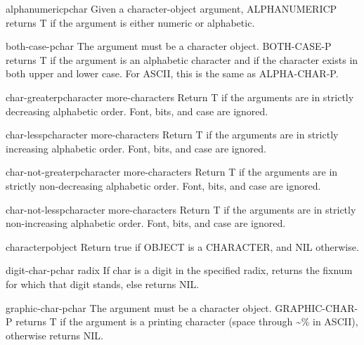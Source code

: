 \documentclass[10pt,english]{book}
\begin{document}
\begin{function}{alphanumericp}{char}
  Given a character-object argument, ALPHANUMERICP returns T if the
   argument is either numeric or alphabetic.
\end{function}

\begin{function}{both-case-p}{char}
  The argument must be a character object. BOTH-CASE-P returns T if the
  argument is an alphabetic character and if the character exists in
  both upper and lower case. For ASCII, this is the same as ALPHA-CHAR-P.
\end{function}

\begin{function}{char-greaterp}{character \rest more-characters}
  Return T if the arguments are in strictly decreasing alphabetic order.
   Font, bits, and case are ignored.
\end{function}

\begin{function}{char-lessp}{character \rest more-characters}
  Return T if the arguments are in strictly increasing alphabetic order.
   Font, bits, and case are ignored.
\end{function}

\begin{function}{char-not-greaterp}{character \rest more-characters}
  Return T if the arguments are in strictly non-decreasing alphabetic order.
   Font, bits, and case are ignored.
\end{function}

\begin{function}{char-not-lessp}{character \rest more-characters}
  Return T if the arguments are in strictly non-increasing alphabetic order.
   Font, bits, and case are ignored.
\end{function}

\begin{function}{characterp}{object}
  Return true if OBJECT is a CHARACTER, and NIL otherwise.
\end{function}

\begin{function}{digit-char-p}{char \op radix}
  If char is a digit in the specified radix, returns the fixnum for
  which that digit stands, else returns NIL.
\end{function}

\begin{function}{graphic-char-p}{char}
  The argument must be a character object. GRAPHIC-CHAR-P returns T if the
  argument is a printing character (space through \~{}\% in ASCII), otherwise
  returns NIL.
\end{function}
\end{document}
